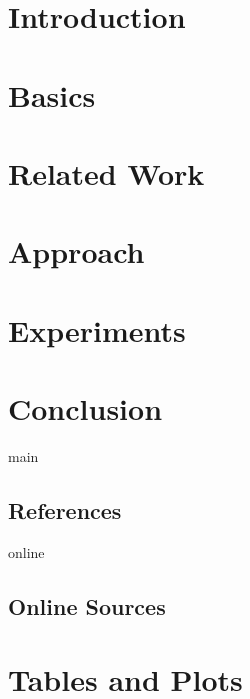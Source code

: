\documentclass[11pt,a4paper]{report}
\begin{document}
    \setcounter{tocdepth}{4}
    \tableofcontents
    \newpage


    \chapter{Introduction}
    \label{ch:1_introduction}
    


    \chapter{Basics}
    \label{ch:2_basics}
    


    \chapter{Related Work}
    \label{ch:3_related_work}
    


    \chapter{Approach}
    \label{ch:4_approach}
    


    \chapter{Experiments}
    \label{ch:5_experiments}
    


    \chapter{Conclusion}
    \label{ch:6_conclusion}
    

    \newpage

    

    \begin{btSect}{main}
        \section*{References}
        \btPrintCited
    \end{btSect}

    \begin{btSect}{online}
        \section*{Online Sources}
        \btPrintCited
    \end{btSect}


    \appendix


    \chapter{Tables and Plots}
    \label{ch:a_appendix}
    
\end{document}
